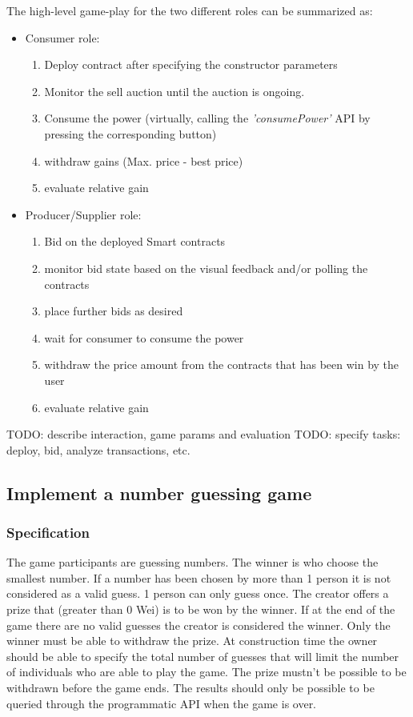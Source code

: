 \documentclass[a4paper]{article}
\begin{document}
The high-level game-play for the two different roles can be summarized as:
\begin{itemize}
    \item Consumer role:
    \begin{enumerate}
        \item Deploy contract after specifying the constructor parameters
        \item Monitor the sell auction until the auction is ongoing.
        \item Consume the power (virtually, calling the \emph{'consumePower'} API by pressing the corresponding button)
        \item withdraw gains (Max. price - best price)
        \item evaluate relative gain
    \end{enumerate}
    \item Producer/Supplier role:
    \begin{enumerate}
        \item Bid on the deployed Smart contracts
        \item monitor bid state based on the visual feedback and/or polling the contracts
        \item place further bids as desired
        \item wait for consumer to consume the power
        \item withdraw the price amount from the contracts that has been win by the user
        \item evaluate relative gain
    \end{enumerate}
\end{itemize}

TODO: describe interaction, game params and evaluation
TODO: specify tasks: deploy, bid, analyze transactions, etc.

\subsection{Implement a number guessing game}

\subsubsection{Specification}

The game participants are guessing numbers. The winner is who choose the smallest number. If a number has been chosen by more than 1 person it is not considered as a valid guess. 1 person can only guess once. The creator offers a prize that (greater than 0 Wei) is to be won by the winner. If at the end of the game there are no valid guesses the creator is considered the winner. Only the winner must be able to withdraw the prize. At construction time the owner should be able to specify the total number of guesses that will limit the number of individuals who are able to play the game. The prize mustn't be possible to be withdrawn before the game ends. The results should only be possible to be queried through the programmatic API when the game is over.
\end{document}
